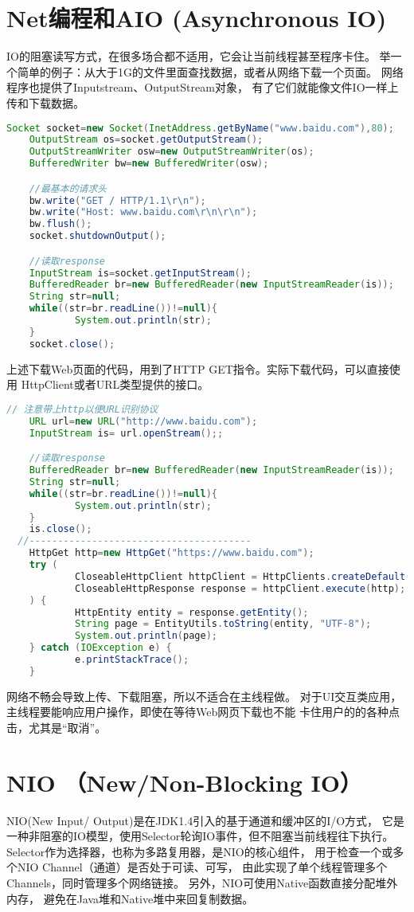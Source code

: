 \section{Net编程和AIO (Asynchronous IO)}
IO的阻塞读写方式，在很多场合都不适用，它会让当前线程甚至程序卡住。
\noindent
举一个简单的例子：从大于1G的文件里面查找数据，或者从网络下载一个页面。
网络程序也提供了Inputstream、OutputStream对象，
有了它们就能像文件IO一样上传和下载数据。

\begin{lstlisting}[language=Java]
	Socket socket=new Socket(InetAddress.getByName("www.baidu.com"),80);
	OutputStream os=socket.getOutputStream();
	OutputStreamWriter osw=new OutputStreamWriter(os);
	BufferedWriter bw=new BufferedWriter(osw);

	//最基本的请求头
	bw.write("GET / HTTP/1.1\r\n");
	bw.write("Host: www.baidu.com\r\n\r\n");
	bw.flush();
	socket.shutdownOutput();

	//读取response
	InputStream is=socket.getInputStream();
	BufferedReader br=new BufferedReader(new InputStreamReader(is));
	String str=null;
	while((str=br.readLine())!=null){
			System.out.println(str);
	}
	socket.close();
\end{lstlisting}

上述下载Web页面的代码，用到了HTTP GET指令。实际下载代码，可以直接使用
HttpClient或者URL类型提供的接口。

\begin{lstlisting}[language=Java]
	// 注意带上http以便URL识别协议
	URL url=new URL("http://www.baidu.com");
	InputStream is= url.openStream();;

	//读取response
	BufferedReader br=new BufferedReader(new InputStreamReader(is));
	String str=null;
	while((str=br.readLine())!=null){
			System.out.println(str);
	}
	is.close();
  //---------------------------------------
	HttpGet http=new HttpGet("https://www.baidu.com");
	try (
			CloseableHttpClient httpClient = HttpClients.createDefault();
			CloseableHttpResponse response = httpClient.execute(http);
	) {
			HttpEntity entity = response.getEntity();
			String page = EntityUtils.toString(entity, "UTF-8");
			System.out.println(page);
	} catch (IOException e) {
			e.printStackTrace();
	}
\end{lstlisting}

\noindent
网络不畅会导致上传、下载阻塞，所以不适合在主线程做。
对于UI交互类应用，主线程要能响应用户操作，即使在等待Web网页下载也不能
卡住用户的的各种点击，尤其是“取消”。

\section{NIO （New/Non-Blocking IO）}
NIO(New Input/ Output)是在JDK1.4引入的基于通道和缓冲区的I/O方式，
它是一种非阻塞的IO模型，使用Selector轮询IO事件，但不阻塞当前线程往下执行。
Selector作为选择器，也称为多路复用器，是NIO的核心组件，
用于检查一个或多个NIO Channel（通道）是否处于可读、可写，
由此实现了单个线程管理多个Channels，同时管理多个网络链接。
另外，NIO可使用Native函数直接分配堆外内存，
避免在Java堆和Native堆中来回复制数据。
\vspace{0.2cm}

